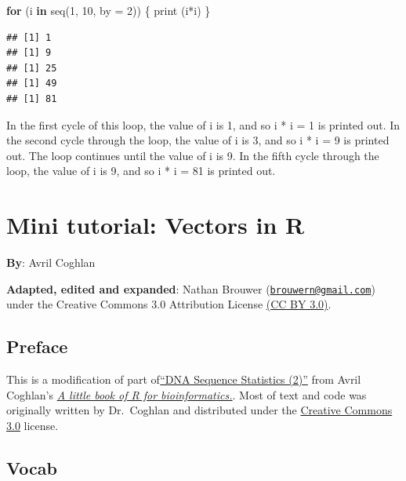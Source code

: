 \documentclass[
]{book}
\newenvironment{Shaded}{\begin{snugshade}}{\end{snugshade}}
\newcommand{\AttributeTok}[1]{\textcolor[rgb]{0.77,0.63,0.00}{#1}}
\newcommand{\ControlFlowTok}[1]{\textcolor[rgb]{0.13,0.29,0.53}{\textbf{#1}}}
\newcommand{\DecValTok}[1]{\textcolor[rgb]{0.00,0.00,0.81}{#1}}
\newcommand{\FunctionTok}[1]{\textcolor[rgb]{0.00,0.00,0.00}{#1}}
\newcommand{\NormalTok}[1]{#1}
\newcommand{\SpecialCharTok}[1]{\textcolor[rgb]{0.00,0.00,0.00}{#1}}
\begin{document}
\begin{Shaded}
\begin{Highlighting}[]
\ControlFlowTok{for}\NormalTok{ (i }\ControlFlowTok{in} \FunctionTok{seq}\NormalTok{(}\DecValTok{1}\NormalTok{, }\DecValTok{10}\NormalTok{, }\AttributeTok{by =} \DecValTok{2}\NormalTok{)) \{ }
  \FunctionTok{print}\NormalTok{ (i}\SpecialCharTok{*}\NormalTok{i) }
\NormalTok{  \}}
\end{Highlighting}
\end{Shaded}

\begin{verbatim}
## [1] 1
## [1] 9
## [1] 25
## [1] 49
## [1] 81
\end{verbatim}

In the first cycle of this loop, the value of i is 1, and so i * i = 1 is printed out. In the second cycle through the loop, the value of i is 3, and so i * i = 9 is printed out. The loop continues until the value of i is 9. In the fifth cycle through the loop, the value of i is 9, and so i * i = 81 is printed out.

\hypertarget{mini-tutorial-vectors-in-r}{%
\chapter{Mini tutorial: Vectors in R}\label{mini-tutorial-vectors-in-r}}

\textbf{By}: Avril Coghlan

\textbf{Adapted, edited and expanded}: Nathan Brouwer (\href{mailto:brouwern@gmail.com}{\nolinkurl{brouwern@gmail.com}}) under the Creative Commons 3.0 Attribution License \href{https://creativecommons.org/licenses/by/3.0/}{(CC BY 3.0)}.

\hypertarget{preface-3}{%
\section{Preface}\label{preface-3}}

This is a modification of part of\href{https://a-little-book-of-r-for-bioinformatics.readthedocs.io/en/latest/src/chapter2.html}{``DNA Sequence Statistics (2)''} from Avril Coghlan's \href{https://a-little-book-of-r-for-bioinformatics.readthedocs.io/en/latest/index.html}{\emph{A little book of R for bioinformatics.}}. Most of text and code was originally written by Dr.~Coghlan and distributed under the \href{https://creativecommons.org/licenses/by/3.0/us/}{Creative Commons 3.0} license.

\hypertarget{vocab-1}{%
\section{Vocab}\label{vocab-1}}
\end{document}
